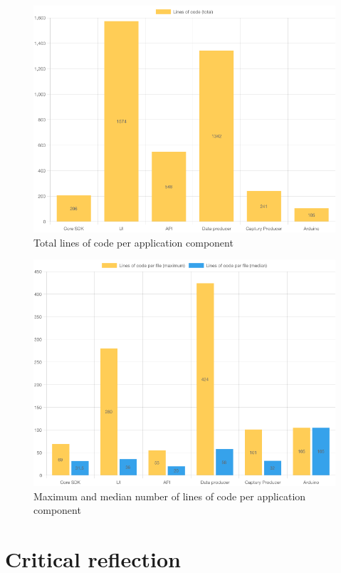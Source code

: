 \begin{figure}[h]
\centering
\includegraphics[scale=0.5]{04_Artefakte/01_Abbildungen/code-stats-loc-total}
\caption[Lines of code (total)]{Total lines of code per application component\protect}
\label{fig:linesOfCodeTotal}
\end{figure}

\begin{figure}[h]
\centering
\includegraphics[scale=0.5]{04_Artefakte/01_Abbildungen/code-stats-loc}
\caption[Lines of code]{Maximum and median number of lines of code per application component\protect}
\label{fig:linesOfCode}
\end{figure}

\section{Critical reflection}
\label{sec:critical-reflection}

